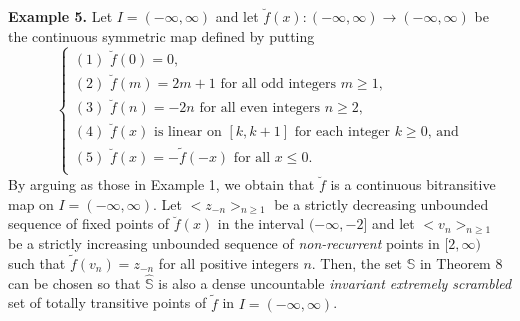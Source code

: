\documentclass[12pt]{article}
\begin{document}
\noindent
{\bf Example 5.} Let $I = (-\infty, \infty)$ and let $\breve f(x) : (-\infty, \infty) \to (-\infty, \infty)$ be the continuous symmetric map defined by putting 
$$
\begin{cases}
(1) \,\, \breve f(0) = 0, \\
(2) \,\, \text{$\breve f(m) = 2m+1$ for all odd integers $m \ge 1$}, \\
(3) \,\, \text{$\breve f(n) = -2n$ for all even integers $n \ge 2$}, \\
(4) \,\, \text{$\breve f(x)$ is linear on $[k, k+1]$ for each integer $k \ge 0$, and} \\
(5) \,\, \text{$\breve f(x) = -\tilde f(-x)$ for all $x \le 0$}.\\
\end{cases}
$$
By arguing as those in Example 1, we obtain that $\breve f$ is a continuous bitransitive map on $I = (-\infty, \infty)$.  Let $<z_{-n}>_{n \ge 1}$ be a strictly decreasing unbounded sequence of fixed points of $\breve f(x)$ in the interval $(-\infty, -2]$ and let $<v_n>_{n \ge 1}$ be a strictly increasing unbounded sequence of {\it non-recurrent} points in $[2, \infty)$ such that $\tilde f(v_n) = z_{-n}$ for all positive integers $n$.  Then, the set $\mathbb S$ in Theorem 8 can be chosen so that $\widehat {\mathbb S}$ is also a dense uncountable {\it invariant extremely scrambled} set of totally transitive points of $\tilde f$ in $I = (-\infty, \infty)$.  
\end{document}
